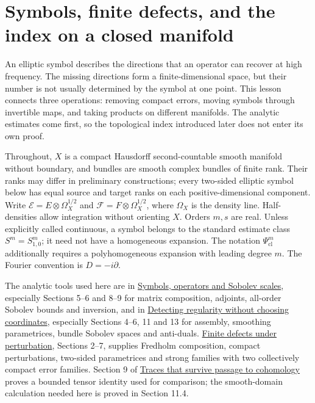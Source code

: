 \documentclass[
  11pt,
]{article}
\author{}
\date{}
\makeatletter
\let\ReaderOriginalAnchorStart\hyper@anchorstart
\let\ReaderOriginalAnchorEnd\hyper@anchorend
\let\ReaderPendingAliases\@empty
\def\ReaderArmAliases#1{\gdef\ReaderPendingAliases{#1}}
\def\hyper@anchorstart#1{\ReaderIfNativeAnchorTF{#1}{\ReaderPendingAliases\global\let\ReaderPendingAliases\@empty}{}\ReaderOriginalAnchorStart{#1}}
\makeatother
\begin{document}
\ReaderArmAliases{\ReaderOriginalAnchorStart{symbols-finite-defects-and-the-index-on-a-closed-manifold}\ReaderOriginalAnchorEnd}
\section{Symbols, finite defects, and the index on a closed
manifold}\label{symbols-finite-defects-and-the-index-on-a-closed-manifold}

An elliptic symbol describes the directions that an operator can recover
at high frequency. The missing directions form a finite-dimensional
space, but their number is not usually determined by the symbol at one
point. This lesson connects three operations: removing compact errors,
moving symbols through invertible maps, and taking products on different
manifolds. The analytic estimates come first, so the topological index
introduced later does not enter its own proof.

Throughout, \(X\) is a compact Hausdorff second-countable smooth
manifold without boundary, and bundles are smooth complex bundles of
finite rank. Their ranks may differ in preliminary constructions; every
two-sided elliptic symbol below has equal source and target ranks on
each positive-dimensional component. Write
\(\mathcal E=E\otimes\Omega_X^{1/2}\) and
\(\mathcal F=F\otimes\Omega_X^{1/2}\), where \(\Omega_X\) is the density
line. Half-densities allow integration without orienting \(X\). Orders
\(m,s\) are real. Unless explicitly called continuous, a symbol belongs
to the standard estimate class \(S^m=S^m_{1,0}\); it need not have a
homogeneous expansion. The notation \(\Psi^m_{\mathrm{cl}}\)
additionally requires a polyhomogeneous expansion with leading degree
\(m\). The Fourier convention is \(D=-i\partial\).

The analytic tools used here are in
\href{euclidean-symbol-calculus.pdf}{Symbols, operators and Sobolev
scales}, especially Sections 5--6 and 8--9 for matrix composition,
adjoints, all-order Sobolev bounds and inversion, and in
\href{geometric-microlocal-calculus.pdf}{Detecting regularity without
choosing coordinates}, especially Sections 4--6, 11 and 13 for assembly,
smoothing parametrices, bundle Sobolev spaces and anti-duals.
\href{fredholm-stability.pdf}{Finite defects under perturbation},
Sections 2--7, supplies Fredholm composition, compact perturbations,
two-sided parametrices and strong families with two collectively compact
error families. Section 9 of \href{traces-and-complexes.pdf}{Traces that
survive passage to cohomology} proves a bounded tensor identity used for
comparison; the smooth-domain calculation needed here is proved in
Section 11.4.
\end{document}
